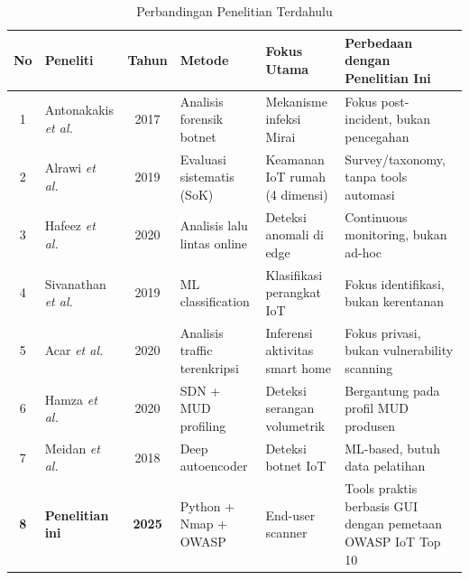 \begin{table}[t]
    \centering
    \caption{Perbandingan Penelitian Terdahulu}
    \label{tab:terdahulu}
    \footnotesize
    \begin{tabular}{|c|l|c|l|l|l|}
        \hline
        \textbf{No} & \textbf{Peneliti} & \textbf{Tahun} & \textbf{Metode} &
        \textbf{Fokus Utama} & \textbf{Perbedaan dengan Penelitian Ini} \\
        \hline
        1 & Antonakakis \textit{et al.}~\cite{b1} & 2017 & Analisis forensik botnet & Mekanisme infeksi Mirai & Fokus post-incident, bukan pencegahan \\
        \hline
        2 & Alrawi \textit{et al.}~\cite{b2} & 2019 & Evaluasi sistematis (SoK) & Keamanan IoT rumah (4 dimensi) & Survey/taxonomy, tanpa tools automasi \\
        \hline
        3 & Hafeez \textit{et al.}~\cite{b4} & 2020 & Analisis lalu lintas online & Deteksi anomali di edge & Continuous monitoring, bukan ad-hoc \\
        \hline
        4 & Sivanathan \textit{et al.}~\cite{b14} & 2019 & ML classification & Klasifikasi perangkat IoT & Fokus identifikasi, bukan kerentanan \\
        \hline
        5 & Acar \textit{et al.}~\cite{b20} & 2020 & Analisis traffic terenkripsi & Inferensi aktivitas smart home & Fokus privasi, bukan vulnerability scanning \\
        \hline
        6 & Hamza \textit{et al.}~\cite{b21} & 2020 & SDN + MUD profiling & Deteksi serangan volumetrik & Bergantung pada profil MUD produsen \\
        \hline
        7 & Meidan \textit{et al.}~\cite{b22} & 2018 & Deep autoencoder & Deteksi botnet IoT & ML-based, butuh data pelatihan \\
        \hline
        \textbf{8} & \textbf{Penelitian ini} & \textbf{2025} & Python + Nmap + OWASP & End-user scanner & Tools praktis berbasis GUI dengan pemetaan OWASP IoT Top 10 \\
        \hline
    \end{tabular}
\end{table}
